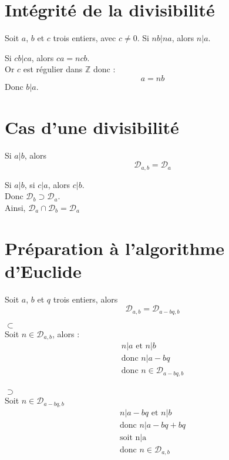 \documentclass[../main.tex]{subfiles}
\begin{document}
\setcounter{section}{13}
\section{Intégrité de la divisibilité}
\begin{tcolorbox}[title=Propostion 12.14, title filled=false, colframe=lightblue, colback=lightblue!10!white]
    Soit $a$, $b$ et $c$ trois entiers, avec $c \neq 0$. Si $nb|na$, alors $n|a$.
\end{tcolorbox}

Si $cb|ca$, alors $ca = ncb$. \\
Or $c$ est régulier dans $\mathbb{Z}$ donc :
$$a = nb$$
Donc $b|a$. 

\setcounter{section}{19}
\section{Cas d'une divisibilité}
\begin{tcolorbox}[title=Lemme 12.20, title filled=false, colframe=orange, colback=orange!10!white]
    Si $a|b$, alors 
    $$\mathcal{D}_{a,b} = \mathcal{D}_a$$
\end{tcolorbox}

Si $a|b$, si $c|a$, alors $c|b$. \\
Donc $\mathcal{D}_b \supset \mathcal{D}_a$. \\
Ainsi, $\mathcal{D}_a \cap \mathcal{D}_b = \mathcal{D}_a$


\section{Préparation à l'algorithme d'Euclide}
\begin{tcolorbox}[title=Lemme 12.21, title filled=false, colframe=orange, colback=orange!10!white]
    Soit $a$, $b$ et $q$ trois entiers, alors
    $$\mathcal{D}_{a,b} = \mathcal{D}_{a - bq, b}$$
\end{tcolorbox}

$\boxed{\subset}$ \\
Soit $n \in \mathcal{D}_{a,b}$, alors : 
\begin{align*}
    n|a \text{ et } n|b \\
    \text{donc } n|a - bq \\
    \text{donc } n \in \mathcal{D}_{a - bq, b}
\end{align*} \\

$\boxed{\supset}$ \\
Soit $n \in \mathcal{D}_{a - bq, b}$
\begin{align*}
    n|a - bq \text{ et } n|b \\
    \text{donc } n|a - bq + bq \\
    \text{soit n|a} \\
    \text{donc } n \in \mathcal{D}_{a,b}
\end{align*}
\end{document}
